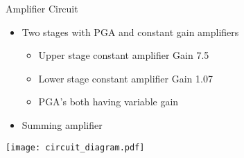 \begin{frame}{Amplifier Circuit}
  \begin{itemize}
    \item Two stages with PGA and constant gain amplifiers
    \begin{itemize}
      \item Upper stage constant amplifier Gain 7.5 
      \item Lower stage constant amplifier Gain 1.07
      \item PGA's both having variable gain
    \end{itemize}
    \item Summing amplifier
  \end{itemize}

  \begin{center}
  \texttt{[image: circuit\_diagram.pdf]}
  \end{center}
\end{frame}


